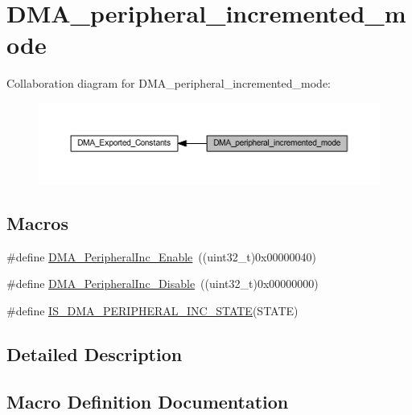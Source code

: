 \hypertarget{group___d_m_a__peripheral__incremented__mode}{}\section{D\+M\+A\+\_\+peripheral\+\_\+incremented\+\_\+mode}
\label{group___d_m_a__peripheral__incremented__mode}
Collaboration diagram for D\+M\+A\+\_\+peripheral\+\_\+incremented\+\_\+mode\+:
\nopagebreak
\begin{figure}[H]
\begin{center}
\leavevmode
\includegraphics[width=350pt]{group___d_m_a__peripheral__incremented__mode}
\end{center}
\end{figure}
\subsection*{Macros}
\begin{DoxyCompactItemize}
\item 
\#define \hyperlink{group___d_m_a__peripheral__incremented__mode_gaf7921ea423fb60701a091c508cd0f33a}{D\+M\+A\+\_\+\+Peripheral\+Inc\+\_\+\+Enable}~((uint32\+\_\+t)0x00000040)
\item 
\#define \hyperlink{group___d_m_a__peripheral__incremented__mode_ga0fe3ff9c67bec802dd239fd17c3dbd31}{D\+M\+A\+\_\+\+Peripheral\+Inc\+\_\+\+Disable}~((uint32\+\_\+t)0x00000000)
\item 
\#define \hyperlink{group___d_m_a__peripheral__incremented__mode_ga28762105b3f567c16ba79a47e68ff0fa}{I\+S\+\_\+\+D\+M\+A\+\_\+\+P\+E\+R\+I\+P\+H\+E\+R\+A\+L\+\_\+\+I\+N\+C\+\_\+\+S\+T\+A\+TE}(S\+T\+A\+TE)
\end{DoxyCompactItemize}


\subsection{Detailed Description}


\subsection{Macro Definition Documentation}
\mbox{\label{group___d_m_a__peripheral__incremented__mode_ga0fe3ff9c67bec802dd239fd17c3dbd31}} 
